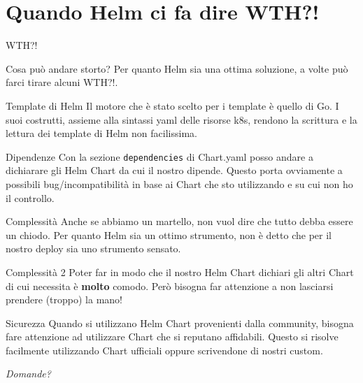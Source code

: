 \documentclass{beamer}
\begin{document}
\section{Quando Helm ci fa dire WTH?!}
\begin{frame}{WTH?!}
\begin{block}{Cosa può andare storto?}
Per quanto Helm sia una ottima soluzione, a volte può farci tirare alcuni  WTH?!.
\end{block}
\framebreak
\begin{block}{Template di Helm}
 Il motore che è stato scelto per i template è quello di Go. \newline
 I suoi costrutti, assieme alla sintassi yaml delle risorse k8s, rendono la scrittura e la lettura dei template di Helm non facilissima.  
\end{block}
\framebreak
\begin{block}{Dipendenze}
Con la sezione \lstinline{dependencies} di Chart.yaml posso andare a dichiarare gli Helm Chart da cui il nostro dipende. \newline 
Questo porta ovviamente a possibili bug/incompatibilità in base ai Chart che sto utilizzando e su cui non ho il controllo.
\end{block}
\framebreak
\begin{block}{Complessità}
Anche se abbiamo un martello, non vuol dire che tutto debba essere un chiodo. \newline Per quanto Helm sia un ottimo strumento, non è detto che per il nostro deploy sia uno strumento sensato.
\end{block}
\framebreak 
\begin{block}{Complessità 2}
Poter far in modo che il nostro Helm Chart dichiari gli altri Chart di cui necessita è \textbf{molto} comodo. \newline Però bisogna far attenzione a non lasciarsi prendere (troppo) la mano!
\end{block}
\framebreak
\begin{block}{Sicurezza}
Quando si utilizzano Helm Chart provenienti dalla community, bisogna fare attenzione ad utilizzare Chart che si reputano affidabili. \newline
Questo si risolve facilmente utilizzando Chart ufficiali oppure scrivendone di nostri custom.
\end{block}
\end{frame}
\begin{frame}{}
\centering \Large \emph{Domande?}
\end{frame}
\end{document}
